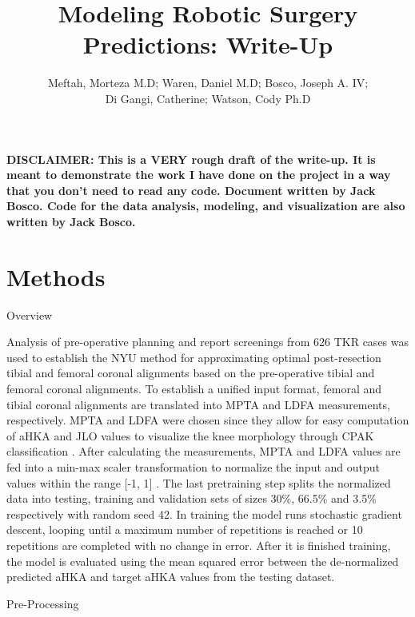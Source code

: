 \documentclass{article}
\author{Meftah, Morteza M.D; Waren, Daniel M.D; Bosco, Joseph A. IV;\\
Di Gangi, Catherine; Watson, Cody Ph.D}
\title{Modeling Robotic Surgery Predictions: Write-Up}
\begin{document}

\newcommand\epochs{86}
\newcommand\batchsize{4}
\newcommand\convergence{6}
\newcommand\rmse{1.3487}
\newcommand\ns{0.587}

\maketitle

\textbf{%
DISCLAIMER:
This is a VERY rough draft of the write-up. 
It is meant to demonstrate the work I have done on the project in a way that you don't need to read any code.
Document written by Jack Bosco. 
Code for the data analysis, modeling, and visualization are also written by Jack Bosco. 
}

\section{Methods}

Overview

	Analysis of pre-operative planning and report screenings from 626 TKR cases
was used to establish the NYU method for approximating optimal post-resection tibial
and femoral coronal alignments based on the pre-operative tibial and femoral coronal alignments.
To establish a unified input format, femoral and tibial coronal alignments are translated into MPTA and LDFA measurements, respectively.
MPTA and LDFA were chosen since they allow for easy computation of aHKA and JLO values to visualize the knee morphology through CPAK classification \cite{cpak-paper}.
After calculating the measurements, MPTA and LDFA values are fed into a min-max scaler transformation to normalize the input and output values within the range [-1, 1] \cite{mm-norm}.
The last pretraining step splits the normalized data into testing, training and validation sets of sizes 30\%, 66.5\% and 3.5\% respectively with random seed 42.
In training the model runs stochastic gradient descent, looping until a maximum number of repetitions is reached or 10 repetitions are completed with no change in error.
After it is finished training, the model is evaluated using the mean squared error between the de-normalized predicted aHKA and target aHKA values from the testing dataset.

Pre-Processing
\end{document}

